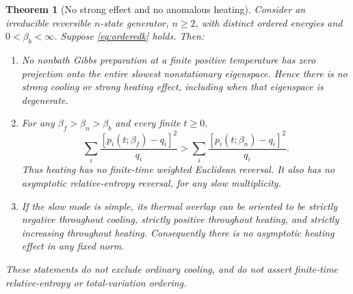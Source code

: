 \documentclass[11pt]{article}
\newtheorem{theorem}{Theorem}
\begin{document}
\begin{theorem}[No strong effect and no anomalous heating]\label{thm:orderedk}
Consider an irreducible reversible $n$-state generator, $n\geq2$, with distinct ordered
energies and $0<\beta_b<\infty$. Suppose \eqref{eq:orderedk} holds.
Then:
\begin{enumerate}
\item No nonbath Gibbs preparation at a finite positive temperature has zero
projection onto the entire slowest nonstationary eigenspace. Hence there is
no strong cooling or strong heating effect, including when that eigenspace
is degenerate.
\item For any $\beta_f>\beta_n>\beta_b$ and every finite $t\geq0$,
\[
\sum_i\frac{[p_i(t;\beta_f)-q_i]^2}{q_i}
>
\sum_i\frac{[p_i(t;\beta_n)-q_i]^2}{q_i}.
\]
Thus heating has no finite-time weighted Euclidean reversal. It also has
no asymptotic relative-entropy reversal, for any slow multiplicity.
\item If the slow mode is simple, its thermal overlap can be oriented to be
strictly negative throughout cooling, strictly positive throughout heating,
and strictly increasing throughout heating. Consequently there is no
asymptotic heating effect in any fixed norm.
\end{enumerate}
These statements do not exclude ordinary cooling, and do not assert
finite-time relative-entropy or total-variation ordering.
\end{theorem}
\end{document}
